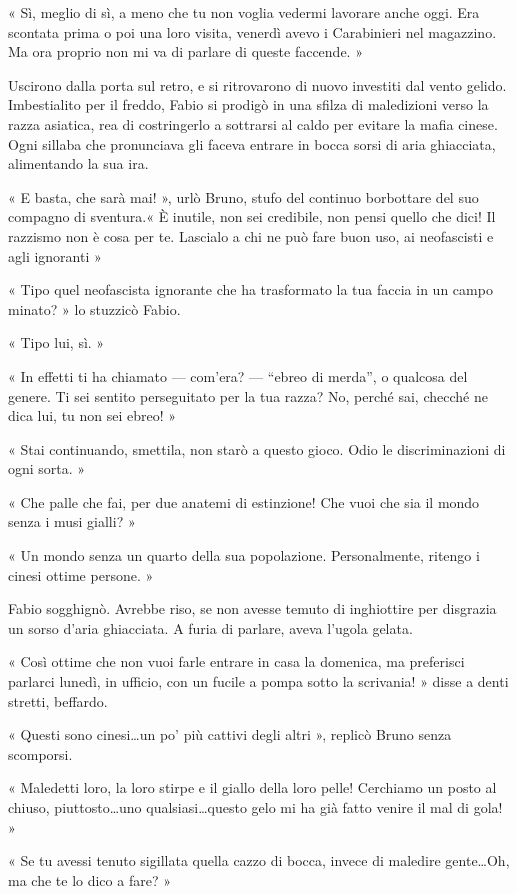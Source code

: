 « Sì, meglio di sì, a meno che tu non voglia vedermi lavorare anche oggi. Era scontata prima o poi una loro visita, venerdì avevo i Carabinieri nel magazzino. Ma ora proprio non mi va di parlare di queste faccende. »

Uscirono dalla porta sul retro, e si ritrovarono di nuovo investiti dal vento gelido. Imbestialito per il freddo, Fabio si prodigò in una sfilza di maledizioni verso la razza asiatica, rea di costringerlo a sottrarsi al caldo per evitare la mafia cinese. Ogni sillaba che pronunciava gli faceva entrare in bocca sorsi di aria ghiacciata, alimentando la sua ira.

« E basta, che sarà mai! », urlò Bruno, stufo del continuo borbottare del suo compagno di sventura.« È inutile, non sei credibile, non pensi quello che dici! Il razzismo non è cosa per te. Lascialo a chi ne può fare buon uso, ai neofascisti e agli ignoranti »

« Tipo quel neofascista ignorante che ha trasformato la tua faccia in un campo minato? » lo stuzzicò Fabio.

« Tipo lui, sì. »

« In effetti ti ha chiamato --- com'era? --- ``ebreo di merda'', o qualcosa del genere. Ti sei sentito perseguitato per la tua razza? No, perché sai, checché ne dica lui, tu non sei ebreo! »

« Stai continuando, smettila, non starò a questo gioco. Odio le discriminazioni di ogni sorta. »

« Che palle che fai, per due anatemi di estinzione! Che vuoi che sia il mondo senza i musi gialli? »

« Un mondo senza un quarto della sua popolazione. Personalmente, ritengo i cinesi ottime persone. »

Fabio sogghignò. Avrebbe riso, se non avesse temuto di inghiottire per disgrazia un sorso d'aria ghiacciata. A furia di parlare, aveva l'ugola gelata.

« Così ottime che non vuoi farle entrare in casa la domenica, ma preferisci parlarci lunedì, in ufficio, con un fucile a pompa sotto la scrivania! » disse a denti stretti, beffardo.

« Questi sono cinesi\ldots un po' più cattivi degli altri », replicò Bruno senza scomporsi.

« Maledetti loro, la loro stirpe e il giallo della loro pelle! Cerchiamo un posto al chiuso, piuttosto\ldots uno qualsiasi\ldots questo gelo mi ha già fatto venire il mal di gola! »

« Se tu avessi tenuto sigillata quella cazzo di bocca, invece di maledire gente\ldots Oh, ma che te lo dico a fare? »

